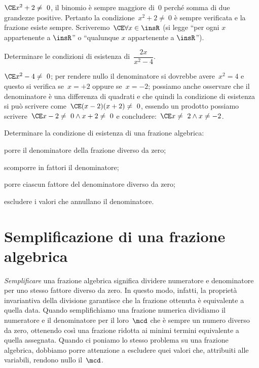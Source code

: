 \begin{exrig}
\begin{esempio}
$\CE x^{2}+2\neq~0$, il binomio è sempre maggiore di~$0$ perché somma di due grandezze positive.
Pertanto la condizione~$x^{2}+2\neq~0$ è sempre verificata e la frazione esiste sempre. Scriveremo~$\CE \forall x\in \insR$ (si legge ``per ogni $x$ appartenente a $\insR$'' o ``qualunque $x$ appartenente a $\insR$'').
 \end{esempio}

 \begin{esempio}
Determinare le condizioni di esistenza di~$\dfrac{2x}{x^{2}-4}$.

$\CE x^{2}-4\neq~0$; per rendere nullo il denominatore si dovrebbe avere~$x^2 = 4$ e questo si verifica se~$x = +2$
oppure se~$x = -2$; possiamo anche osservare che il denominatore è una differenza di quadrati e che quindi la
condizione di esistenza si può scrivere come~$\CE (x-2)(x+2)\neq~0$, essendo un prodotto possiamo
scrivere~$\CE x-2\neq~0\wedge x+2\neq~0$ e concludere:~$\CE x\neq~2\wedge x\neq -2$.
 \end{esempio}
\end{exrig}

\begin{procedura}
Determinare la condizione di esistenza di una frazione algebrica:
\begin{enumeratea}
\item porre il denominatore della frazione diverso da zero;
\item scomporre in fattori il denominatore;
\item porre ciascun fattore del denominatore diverso da zero;
\item escludere i valori che annullano il denominatore.
\end{enumeratea}
\end{procedura}
\ovalbox{\risolvii \ref{ese:19.1}, \ref{ese:19.2}, \ref{ese:19.3}, \ref{ese:19.4}}

\section{Semplificazione di una frazione algebrica}

\emph{Semplificare} una frazione algebrica significa dividere numeratore e denominatore per uno stesso fattore diverso da zero.
In questo modo, infatti, la proprietà invariantiva della divisione garantisce che la frazione ottenuta è equivalente a quella data.
Quando semplifichiamo una frazione numerica dividiamo il numeratore e il denominatore per il loro~$\mcd$
che è sempre un numero diverso da zero, ottenendo così una frazione ridotta ai minimi termini equivalente a quella assegnata.
Quando ci poniamo lo stesso problema su una frazione algebrica, dobbiamo porre attenzione a escludere quei valori
che, attribuiti alle variabili, rendono nullo il~$\mcd$.

